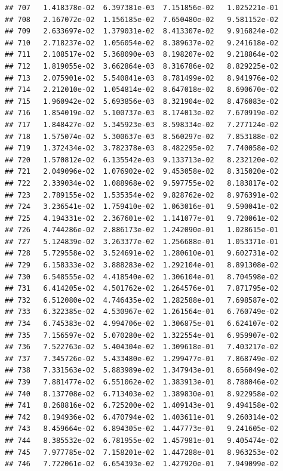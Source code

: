 \documentclass[
]{article}
\begin{document}
\begin{verbatim}
## 707   1.418378e-02  6.397381e-03  7.151856e-02   1.025221e-01
## 708   2.167072e-02  1.156185e-02  7.650480e-02   9.581152e-02
## 709   2.633697e-02  1.379031e-02  8.413307e-02   9.916824e-02
## 710   2.718237e-02  1.056054e-02  8.389637e-02   9.241618e-02
## 711   2.108517e-02  5.368090e-03  8.198207e-02   9.218864e-02
## 712   1.819055e-02  3.662864e-03  8.316786e-02   8.829225e-02
## 713   2.075901e-02  5.540841e-03  8.781499e-02   8.941976e-02
## 714   2.212010e-02  1.054814e-02  8.647018e-02   8.690670e-02
## 715   1.960942e-02  5.693856e-03  8.321904e-02   8.476083e-02
## 716   1.854019e-02  5.100737e-03  8.174013e-02   7.670919e-02
## 717   1.848427e-02  5.345923e-03  8.598334e-02   7.277124e-02
## 718   1.575074e-02  5.300637e-03  8.560297e-02   7.853188e-02
## 719   1.372434e-02  3.782378e-03  8.482295e-02   7.740058e-02
## 720   1.570812e-02  6.135542e-03  9.133713e-02   8.232120e-02
## 721   2.049096e-02  1.076902e-02  9.453058e-02   8.315020e-02
## 722   2.339034e-02  1.088968e-02  9.597755e-02   8.183817e-02
## 723   2.789155e-02  1.535354e-02  9.828762e-02   8.976391e-02
## 724   3.236541e-02  1.759410e-02  1.063016e-01   9.590041e-02
## 725   4.194331e-02  2.367601e-02  1.141077e-01   9.720061e-02
## 726   4.744286e-02  2.886173e-02  1.242090e-01   1.028615e-01
## 727   5.124839e-02  3.263377e-02  1.256688e-01   1.053371e-01
## 728   5.729558e-02  3.524691e-02  1.280610e-01   9.602731e-02
## 729   6.158333e-02  3.888283e-02  1.292104e-01   8.891308e-02
## 730   6.548555e-02  4.418540e-02  1.306104e-01   8.704598e-02
## 731   6.414205e-02  4.501762e-02  1.264576e-01   7.871795e-02
## 732   6.512080e-02  4.746435e-02  1.282588e-01   7.698587e-02
## 733   6.322385e-02  4.530967e-02  1.261564e-01   6.760749e-02
## 734   6.745383e-02  4.994706e-02  1.306875e-01   6.624107e-02
## 735   7.156597e-02  5.070280e-02  1.322554e-01   6.959907e-02
## 736   7.522763e-02  5.404304e-02  1.309618e-01   7.403217e-02
## 737   7.345726e-02  5.433480e-02  1.299477e-01   7.868749e-02
## 738   7.331563e-02  5.883989e-02  1.347943e-01   8.656049e-02
## 739   7.881477e-02  6.551062e-02  1.383913e-01   8.788046e-02
## 740   8.137708e-02  6.713403e-02  1.389830e-01   8.922958e-02
## 741   8.268816e-02  6.725200e-02  1.409143e-01   9.494158e-02
## 742   8.194936e-02  6.470794e-02  1.403611e-01   9.260314e-02
## 743   8.459664e-02  6.894305e-02  1.447773e-01   9.241605e-02
## 744   8.385532e-02  6.781955e-02  1.457981e-01   9.405474e-02
## 745   7.977785e-02  7.158201e-02  1.447288e-01   8.963253e-02
## 746   7.722061e-02  6.654393e-02  1.427920e-01   7.949099e-02

\end{verbatim}
\end{document}
